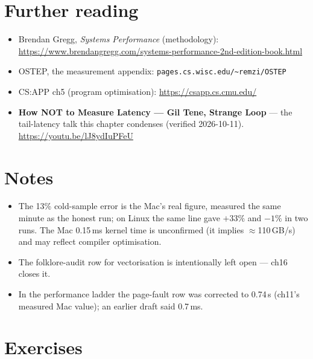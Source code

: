 \section*{Further reading}
\begin{itemize}
\item Brendan Gregg, \emph{Systems Performance} (methodology):
      \url{https://www.brendangregg.com/systems-performance-2nd-edition-book.html}
\item OSTEP, the measurement appendix: \texttt{pages.cs.wisc.edu/\~{}remzi/OSTEP}
\item CS:APP ch5 (program optimisation):
      \url{https://csapp.cs.cmu.edu/}
\end{itemize}

\begin{rulebox}
\begin{itemize}
\item \textbf{How NOT to Measure Latency --- Gil Tene, Strange Loop}
      --- the tail-latency talk this chapter condenses
      (verified 2026-10-11).
      \url{https://youtu.be/lJ8ydIuPFeU}
\end{itemize}
\end{rulebox}

\section*{Notes}
\begin{itemize}
\item The 13\% cold-sample error is the Mac's real figure, measured
      the same minute as the honest run; on Linux the same line gave
      $+33\%$ and $-1\%$ in two runs. The Mac 0.15\,ms kernel time is
      unconfirmed (it implies $\approx$110\,GB/s) and may reflect
      compiler optimisation.
\item The folklore-audit row for vectorisation is intentionally
      left open --- ch16 closes it.
\item In the performance ladder the page-fault row was corrected to
      0.74\,\textmu s (ch11's measured Mac value); an earlier draft
      said 0.7\,ms.
\end{itemize}

\section*{Exercises}

